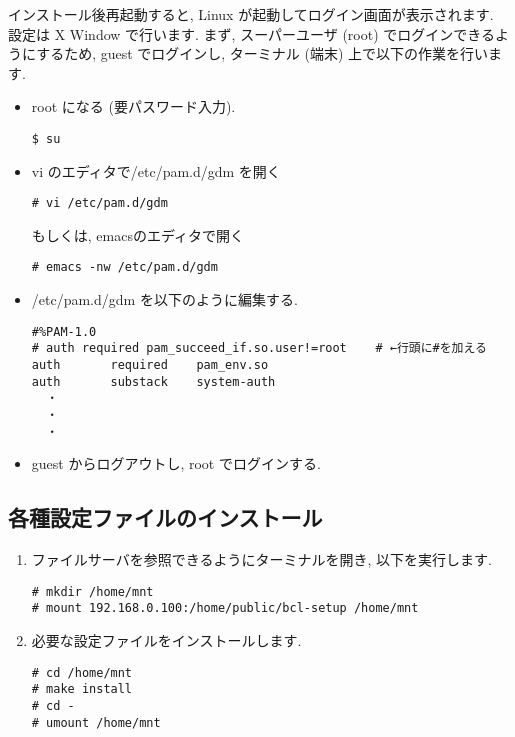 \documentclass{jarticle}
\begin{document}
インストール後再起動すると, Linux が起動してログイン画面が表示されます.
設定は X Window で行います. まず, スーパーユーザ (root) でログインできるようにするため,
guest でログインし, ターミナル (端末) 上で以下の作業を行います.
\begin{itemize}
	\item root になる (要パスワード入力).
\begin{verbatim}
$ su
\end{verbatim}
	\item vi のエディタで/etc/pam.d/gdm を開く
\begin{verbatim}
# vi /etc/pam.d/gdm
\end{verbatim}
もしくは, emacsのエディタで開く
\begin{verbatim}
# emacs -nw /etc/pam.d/gdm
\end{verbatim}
	\item /etc/pam.d/gdm を以下のように編集する.
\begin{verbatim}
#%PAM-1.0
# auth required pam_succeed_if.so.user!=root    # ←行頭に#を加える
auth       required    pam_env.so
auth       substack    system-auth
  ・
  ・
  ・
\end{verbatim}
	\item guest からログアウトし, root でログインする.
\end{itemize}


\subsection{各種設定ファイルのインストール\label{sec:cfg_ins}}

\begin{enumerate}
	\item ファイルサーバを参照できるようにターミナルを開き, 以下を実行します.
\begin{verbatim}
# mkdir /home/mnt
# mount 192.168.0.100:/home/public/bcl-setup /home/mnt
\end{verbatim}
	\item 必要な設定ファイルをインストールします.
\begin{verbatim}
# cd /home/mnt
# make install
# cd -
# umount /home/mnt
\end{verbatim}
\end{enumerate}
\end{document}
